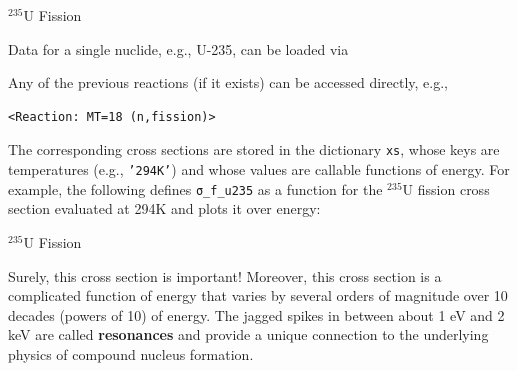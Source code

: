 \documentclass[aspectratio=1610]{beamer}
\begin{document}
\begin{frame}[fragile]{${}^{235}$U Fission}

Data for a single nuclide, e.g., U-235, can be loaded via

\begin{Shaded}
\begin{Highlighting}[]
\OperatorTok{=}\OperatorTok{+}\NormalTok{)}
\end{Highlighting}
\end{Shaded}

Any of the previous reactions (if it exists) can be accessed directly, e.g.,

\begin{Shaded}
\begin{Highlighting}[]
\NormalTok{U235.reactions[}\NormalTok{]}
\end{Highlighting}
\end{Shaded}

\begin{verbatim}
<Reaction: MT=18 (n,fission)>
\end{verbatim}

The corresponding cross sections are stored in the dictionary 
\texttt{xs}, whose keys are temperatures (e.g., {\tt '294K'}) and whose values 
are callable functions of energy.  
For example, the following defines \texttt{σ\_f\_u235} as a function for the
${}^{235}$U fission cross section evaluated at 294K and plots it over energy:

\begin{Shaded}
\begin{Highlighting}[]
\OperatorTok{=}\NormalTok{ U235.reactions[}\NormalTok{].xs[}\NormalTok{]}
\OperatorTok{=}\OperatorTok{-}\NormalTok{, }\NormalTok{, }\NormalTok{)}
\end{Highlighting}
\end{Shaded}

 
\end{frame}

\begin{frame}[fragile]{${}^{235}$U Fission}


\begin{figure}[h]
    \centering
    \resizebox{0.95\textwidth}{!}{}
\end{figure}
 
Surely, this cross section is important! Moreover, this
cross section is a complicated function of energy that varies by several
orders of magnitude over 10 decades (powers of 10) of energy. The jagged
spikes in between about 1 eV and 2 keV are called \textbf{resonances}
and provide a unique connection to the underlying physics of compound
nucleus formation.

  
\end{frame}
\end{document}
